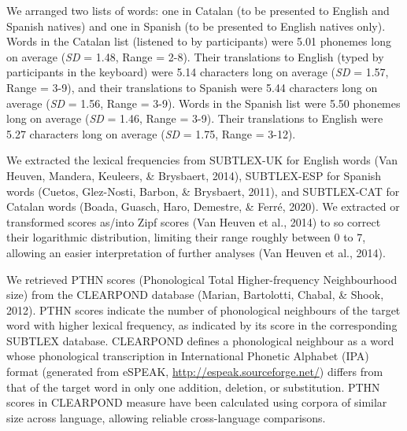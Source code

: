 \documentclass[
  english,
  man,floatsintext]{apa6}
\begin{document}
We arranged two lists of words: one in Catalan (to be presented to English and Spanish natives) and one in Spanish (to be presented to English natives only). Words in the Catalan list (listened to by participants) were 5.01 phonemes long on average (\emph{SD} = 1.48, Range = 2-8). Their translations to English (typed by participants in the keyboard) were 5.14 characters long on average (\emph{SD} = 1.57, Range = 3-9), and their translations to Spanish were 5.44 characters long on average (\emph{SD} = 1.56, Range = 3-9). Words in the Spanish list were 5.50 phonemes long on average (\emph{SD} = 1.46, Range = 3-9). Their translations to English were 5.27 characters long on average (\emph{SD} = 1.75, Range = 3-12).

We extracted the lexical frequencies from SUBTLEX-UK for English words (Van Heuven, Mandera, Keuleers, \& Brysbaert, 2014), SUBTLEX-ESP for Spanish words (Cuetos, Glez-Nosti, Barbon, \& Brysbaert, 2011), and SUBTLEX-CAT for Catalan words (Boada, Guasch, Haro, Demestre, \& Ferré, 2020). We extracted or transformed scores as/into Zipf scores (Van Heuven et al., 2014) to so correct their logarithmic distribution, limiting their range roughly between 0 to 7, allowing an easier interpretation of further analyses (Van Heuven et al., 2014).

We retrieved PTHN scores (Phonological Total Higher-frequency Neighbourhood size) from the CLEARPOND database (Marian, Bartolotti, Chabal, \& Shook, 2012). PTHN scores indicate the number of phonological neighbours of the target word with higher lexical frequency, as indicated by its score in the corresponding SUBTLEX database. CLEARPOND defines a phonological neighbour as a word whose phonological transcription in International Phonetic Alphabet (IPA) format (generated from eSPEAK, \url{http://espeak.sourceforge.net/}) differs from that of the target word in only one addition, deletion, or substitution. PTHN scores in CLEARPOND measure have been calculated using corpora of similar size across language, allowing reliable cross-language comparisons.
\end{document}

